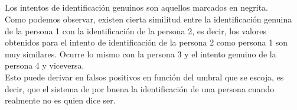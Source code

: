 \documentclass[10pt,a4paper]{article}
\begin{document}
\subsection{}
\begin{table}[htbp]
  \caption{Medidas de similitud}
  \label{tabla:medidas}
\end{table}

Los intentos de identificación genuinos son aquellos marcados en negrita.\\
Como podemos observar, existen cierta similitud entre la identificación genuina de la persona 1 con la identificación de la persona 2, es decir, los valores obtenidos para el intento de identificación de la persona 2 como persona 1 son muy similares. Ocurre lo mismo con la persona 3 y el intento genuino de la persona 4 y viceversa.\\
Esto puede derivar en falsos positivos en función del umbral que se escoja, es decir, que el sistema de por buena la identificación de una persona cuando realmente no es quien dice ser.
\end{document}
